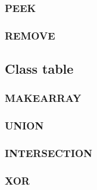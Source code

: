 \subsubsection{PEEK}\label{peek}



\subsubsection{REMOVE}\label{remove-1}



\subsection{Class table}\label{class-table}



\subsubsection{MAKEARRAY}\label{makearray-1}



\subsubsection{UNION}\label{union}



\subsubsection{INTERSECTION}\label{intersection}



\subsubsection{XOR}\label{xor}

